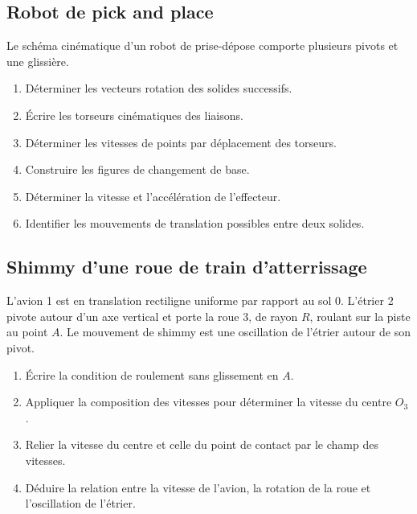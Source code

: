 \subsection{Robot de pick and place}

Le schéma cinématique d'un robot de prise-dépose comporte plusieurs
pivots et une glissière.

\begin{center}
\hfill
{}
\end{center}

\begin{enumerate}
  \item Déterminer les vecteurs rotation des solides successifs.
  \item Écrire les torseurs cinématiques des liaisons.
  \item Déterminer les vitesses de points par déplacement des torseurs.
  \item Construire les figures de changement de base.
  \item Déterminer la vitesse et l'accélération de l'effecteur.
  \item Identifier les mouvements de translation possibles entre deux solides.
\end{enumerate}

\subsection{Shimmy d'une roue de train d'atterrissage}

L'avion 1 est en translation rectiligne uniforme par rapport au sol 0.
L'étrier 2 pivote autour d'un axe vertical et porte la roue 3, de rayon
$R$, roulant sur la piste au point $A$. Le mouvement de shimmy est une
oscillation de l'étrier autour de son pivot.


\begin{enumerate}
  \item Écrire la condition de roulement sans glissement en $A$.
  \item Appliquer la composition des vitesses pour déterminer la vitesse du centre $O_3$.
  \item Relier la vitesse du centre et celle du point de contact par le champ des vitesses.
  \item Déduire la relation entre la vitesse de l'avion, la rotation de la roue et l'oscillation de l'étrier.
\end{enumerate}

